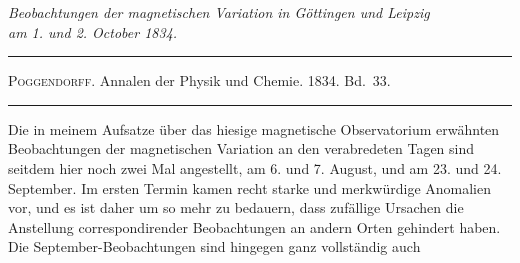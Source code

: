 \bigskip
{}
\begin{center}\itshape
Beobachtungen der magnetischen Variation in Göttingen und Leipzig\\
am 1. und 2. October 1834.
\end{center}
\begin{center}
\hrule\vspace{2mm}
\textsc{Poggendorff}. Annalen der Physik und Chemie. 1834. Bd.\ 33.
\vspace{2mm}\hrule\vspace{5mm}
\end{center}
Die in meinem Aufsatze über das hiesige magnetische Observatorium erwähnten Beobachtungen der magnetischen Variation an den verabredeten Tagen sind seitdem hier noch zwei Mal angestellt, am 6. und 7. August, und am 23. und 24. September. Im ersten Termin kamen recht starke und merkwürdige Anomalien vor, und es ist daher um so mehr zu bedauern, dass zufällige Ursachen die Anstellung correspondirender Beobachtungen an andern Orten gehindert haben. Die September-Beobachtungen sind hingegen ganz vollständig auch
